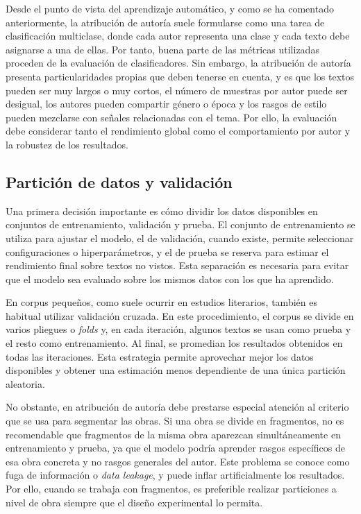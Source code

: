 \documentclass[IB]{TFUOC}%
\begin{document}
Desde el punto de vista del aprendizaje automático, y como se ha comentado anteriormente, la atribución de autoría suele formularse como una tarea de clasificación multiclase, donde cada autor representa una clase y cada texto debe asignarse a una de ellas\cite{stamatatos2009survey}. Por tanto, buena parte de las métricas utilizadas proceden de la evaluación de clasificadores. Sin embargo, la atribución de autoría presenta particularidades propias que deben tenerse en cuenta, y es que los textos pueden ser muy largos o muy cortos, el número de muestras por autor puede ser desigual, los autores pueden compartir género o época y los rasgos de estilo pueden mezclarse con señales relacionadas con el tema. Por ello, la evaluación debe considerar tanto el rendimiento global como el comportamiento por autor y la robustez de los resultados.

\subsection{Partición de datos y validación}

Una primera decisión importante es cómo dividir los datos disponibles en conjuntos de entrenamiento, validación y prueba. El conjunto de entrenamiento se utiliza para ajustar el modelo, el de validación, cuando existe, permite seleccionar configuraciones o hiperparámetros, y el de prueba se reserva para estimar el rendimiento final sobre textos no vistos. Esta separación es necesaria para evitar que el modelo sea evaluado sobre los mismos datos con los que ha aprendido.

En corpus pequeños, como suele ocurrir en estudios literarios, también es habitual utilizar validación cruzada. En este procedimiento, el corpus se divide en varios pliegues o \textit{folds} y, en cada iteración, algunos textos se usan como prueba y el resto como entrenamiento. Al final, se promedian los resultados obtenidos en todas las iteraciones. Esta estrategia permite aprovechar mejor los datos disponibles y obtener una estimación menos dependiente de una única partición aleatoria.

No obstante, en atribución de autoría debe prestarse especial atención al criterio que se usa para segmentar las obras. Si una obra se divide en fragmentos, no es recomendable que fragmentos de la misma obra aparezcan simultáneamente en entrenamiento y prueba, ya que el modelo podría aprender rasgos específicos de esa obra concreta y no rasgos generales del autor. Este problema se conoce como fuga de información o \textit{data leakage}, y puede inflar artificialmente los resultados. Por ello, cuando se trabaja con fragmentos, es preferible realizar particiones a nivel de obra siempre que el diseño experimental lo permita.
\end{document}

